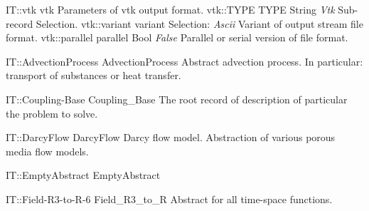 \begin{RecordType}
	{IT::vtk}
	{vtk}
	{} %
	{} %
	{{{Parameters of vtk output format.}}}
		\RecKey
			{vtk::TYPE}
			{TYPE}
			{{String}}
			{ \it{Vtk} }
			{{{Sub-record Selection.}}}
		\RecKey
			{vtk::variant}
			{variant}
			{{Selection}{: }}
			{ \it{Ascii} }
			{{{Variant of output stream file format.}}}
		\RecKey
			{vtk::parallel}
			{parallel}
			{{Bool}}
			{ \it{False} }
			{{{Parallel or serial version of file format.}}}
\end{RecordType}
\begin{AbstractType}
	{IT::AdvectionProcess}
	{AdvectionProcess}
	{}
	{{{Abstract advection process. In particular: transport of substances or heat transfer.}}}
\end{AbstractType}
\begin{AbstractType}
	{IT::Coupling-Base}
	{Coupling{\_}Base}
	{}
	{{{The root record of description of particular the problem to solve.}}}
\end{AbstractType}
\begin{AbstractType}
	{IT::DarcyFlow}
	{DarcyFlow}
	{}
	{{{Darcy flow model. Abstraction of various porous media flow models.}}}
\end{AbstractType}
\begin{AbstractType}
	{IT::EmptyAbstract}
	{EmptyAbstract}
	{}
	{}
\end{AbstractType}
\begin{AbstractType}
	{IT::Field-R3-to-R-6}
	{Field{\_}R3{\_}to{\_}R}
	{}
	{{{Abstract for all time-space functions.}}}
\end{AbstractType}
